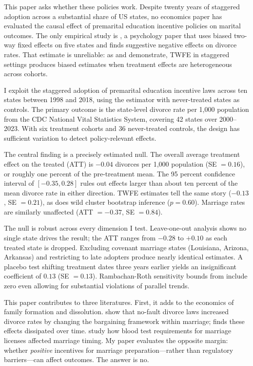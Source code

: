 \documentclass[12pt]{article}
\begin{document}
This paper asks whether these policies work. Despite twenty years of staggered adoption across a substantial share of US states, no economics paper has evaluated the causal effect of premarital education incentive policies on marital outcomes. The only empirical study is \citet{clyde2019premarital}, a psychology paper that uses biased two-way fixed effects on five states and finds suggestive negative effects on divorce rates. That estimate is unreliable: as \citet{goodman2021difference} and \citet{callaway2021difference} demonstrate, TWFE in staggered settings produces biased estimates when treatment effects are heterogeneous across cohorts.

I exploit the staggered adoption of premarital education incentive laws across ten states between 1998 and 2018, using the \citet{callaway2021difference} estimator with never-treated states as controls. The primary outcome is the state-level divorce rate per 1,000 population from the CDC National Vital Statistics System, covering 42 states over 2000--2023. With six treatment cohorts and 36 never-treated controls, the design has sufficient variation to detect policy-relevant effects.

The central finding is a precisely estimated null. The overall average treatment effect on the treated (ATT) is $-0.04$ divorces per 1,000 population (SE $= 0.16$), or roughly one percent of the pre-treatment mean. The 95 percent confidence interval of $[-0.35, 0.28]$ rules out effects larger than about ten percent of the mean divorce rate in either direction. TWFE estimates tell the same story ($-0.13$, SE $= 0.21$), as does wild cluster bootstrap inference ($p = 0.60$). Marriage rates are similarly unaffected (ATT $= -0.37$, SE $= 0.84$).

The null is robust across every dimension I test. Leave-one-out analysis shows no single state drives the result; the ATT ranges from $-0.28$ to $+0.10$ as each treated state is dropped. Excluding covenant marriage states (Louisiana, Arizona, Arkansas) and restricting to late adopters produce nearly identical estimates. A placebo test shifting treatment dates three years earlier yields an insignificant coefficient of $0.13$ (SE $= 0.13$). Rambachan-Roth sensitivity bounds from \citet{rambachan2023more} include zero even allowing for substantial violations of parallel trends.

This paper contributes to three literatures. First, it adds to the economics of family formation and dissolution. \citet{stevenson2006bargaining} show that no-fault divorce laws increased divorce rates by changing the bargaining framework within marriage; \citet{wolfers2006did} finds these effects dissipated over time. \citet{buckles2011shotgun} study how blood test requirements for marriage licenses affected marriage timing. My paper evaluates the opposite margin: whether \textit{positive} incentives for marriage preparation---rather than regulatory barriers---can affect outcomes. The answer is no.
\end{document}
